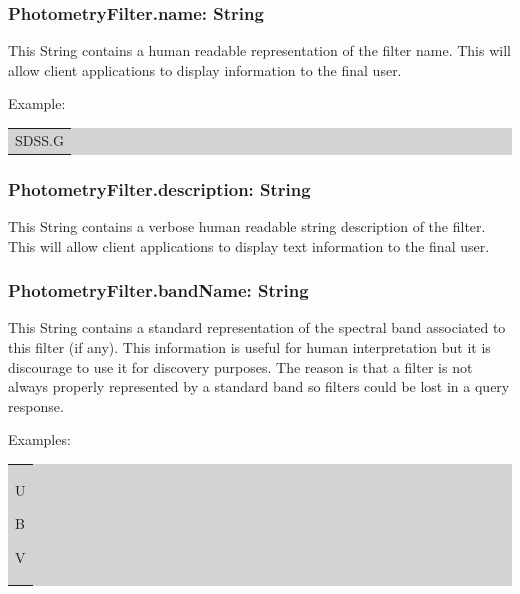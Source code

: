 \documentclass[11pt,a4paper]{ivoa}
\begin{document}

\subsubsection{PhotometryFilter.name: String}
This String contains a human readable representation of the filter name. This will allow client applications to display information to the final user.
\par

Example: 
\par

\bigskip
\begingroup\setlength{\fboxsep}{0pt}
\colorbox{lightgray}{%
\begin{tabular}{|p{5.53in}|}
SDSS.G
\end{tabular}%
}\endgroup
\par
\bigskip




\subsubsection{PhotometryFilter.description: String}
This String contains a verbose human readable string description of the filter. This will allow client applications to display text information to the final user.
\par

\subsubsection{PhotometryFilter.bandName: String}
This String contains a standard representation of the spectral band associated to this filter (if any). This information is useful for human interpretation but it is discourage to use it for discovery purposes. The reason is that a filter is not always properly represented by a standard band so filters could be lost in a query response.
\par

Examples:
\par


\bigskip
\begingroup\setlength{\fboxsep}{0pt}
\colorbox{lightgray}{%
\begin{tabular}{|p{5.53in}|}
U \par B  \par V
\end{tabular}%
}\endgroup
\par
\bigskip
\end{document}
